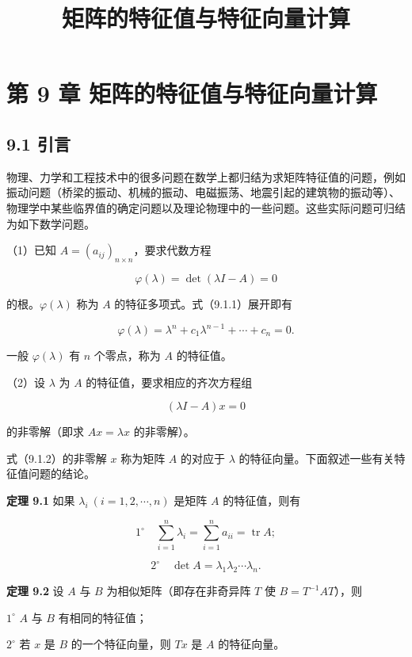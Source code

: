 \documentclass[
  10pt,
  fontset=fandol]{ctexart}
\title{矩阵的特征值与特征向量计算}
\author{}
\date{}
\begin{document}
\maketitle

\section{第 9 章 矩阵的特征值与特征向量计算}\label{ux7b2c-9-ux7ae0-ux77e9ux9635ux7684ux7279ux5f81ux503cux4e0eux7279ux5f81ux5411ux91cfux8ba1ux7b97}

\subsection{9.1 引言}\label{ux5f15ux8a00}

物理、力学和工程技术中的很多问题在数学上都归结为求矩阵特征值的问题，例如振动问题（桥梁的振动、机械的振动、电磁振荡、地震引起的建筑物的振动等）、物理学中某些临界值的确定问题以及理论物理中的一些问题。这些实际问题可归结为如下数学问题。

（1）已知 \(A=(a_{ij})_{n\times n}\)，要求代数方程

\[
\varphi(\lambda)=\det(\lambda I-A)=0
\tag{9.1.1}
\]

的根。\(\varphi(\lambda)\) 称为 \(A\) 的特征多项式。式（9.1.1）展开即有

\[
\varphi(\lambda)=\lambda^n+c_1\lambda^{n-1}+\cdots+c_n=0.
\]

一般 \(\varphi(\lambda)\) 有 \(n\) 个零点，称为 \(A\) 的特征值。

（2）设 \(\lambda\) 为 \(A\) 的特征值，要求相应的齐次方程组

\[
(\lambda I-A)x=0
\tag{9.1.2}
\]

的非零解（即求 \(Ax=\lambda x\) 的非零解）。

式（9.1.2）的非零解 \(x\) 称为矩阵 \(A\) 的对应于 \(\lambda\) 的特征向量。下面叙述一些有关特征值问题的结论。

\textbf{定理 9.1} 如果 \(\lambda_i\ (i=1,2,\cdots,n)\) 是矩阵 \(A\) 的特征值，则有

\[
1^\circ\quad \sum_{i=1}^n\lambda_i=\sum_{i=1}^na_{ii}=\operatorname{tr}A;
\]

\[
2^\circ\quad \det A=\lambda_1\lambda_2\cdots\lambda_n.
\]

\textbf{定理 9.2} 设 \(A\) 与 \(B\) 为相似矩阵（即存在非奇异阵 \(T\) 使 \(B=T^{-1}AT\)），则

\(1^\circ\) \(A\) 与 \(B\) 有相同的特征值；

\(2^\circ\) 若 \(x\) 是 \(B\) 的一个特征向量，则 \(Tx\) 是 \(A\) 的特征向量。
\end{document}
